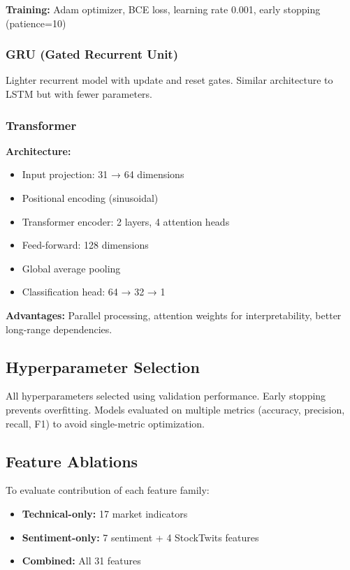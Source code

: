 \documentclass[10pt,twocolumn]{article}
\begin{document}
\textbf{Training:} Adam optimizer, BCE loss, learning rate 0.001, early stopping (patience=10)

\subsubsection{GRU (Gated Recurrent Unit)}

Lighter recurrent model with update and reset gates. Similar architecture to LSTM but with fewer parameters.

\subsubsection{Transformer}

\textbf{Architecture:}
\begin{itemize}
\item Input projection: 31 → 64 dimensions
\item Positional encoding (sinusoidal)
\item Transformer encoder: 2 layers, 4 attention heads
\item Feed-forward: 128 dimensions
\item Global average pooling
\item Classification head: 64 → 32 → 1
\end{itemize}

\textbf{Advantages:} Parallel processing, attention weights for interpretability, better long-range dependencies.

\subsection{Hyperparameter Selection}

All hyperparameters selected using validation performance. Early stopping prevents overfitting. Models evaluated on multiple metrics (accuracy, precision, recall, F1) to avoid single-metric optimization.

\subsection{Feature Ablations}

To evaluate contribution of each feature family:
\begin{itemize}
\item \textbf{Technical-only:} 17 market indicators
\item \textbf{Sentiment-only:} 7 sentiment + 4 StockTwits features
\item \textbf{Combined:} All 31 features
\end{itemize}
\end{document}
